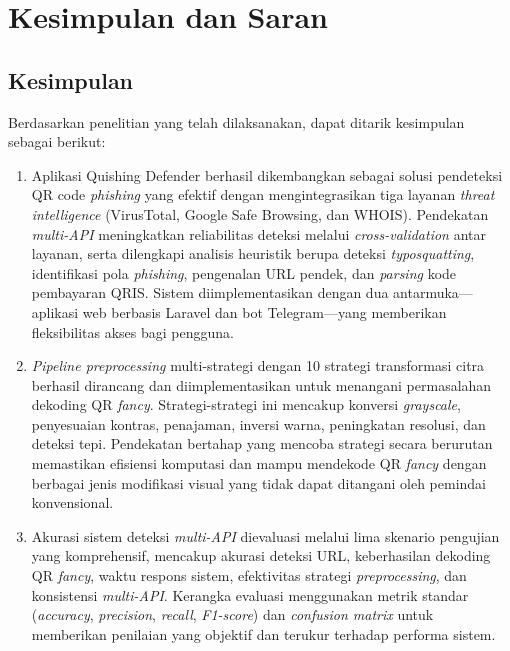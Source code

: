 \documentclass[conference]{IEEEtran}
\begin{document}
\section{Kesimpulan dan Saran}

\subsection{Kesimpulan}

Berdasarkan penelitian yang telah dilaksanakan, dapat ditarik kesimpulan sebagai berikut:

\begin{enumerate}[label=\arabic*)]
    \item Aplikasi Quishing Defender berhasil dikembangkan sebagai solusi pendeteksi QR code \textit{phishing} yang efektif dengan mengintegrasikan tiga layanan \textit{threat intelligence} (VirusTotal, Google Safe Browsing, dan WHOIS). Pendekatan \textit{multi-API} meningkatkan reliabilitas deteksi melalui \textit{cross-validation} antar layanan, serta dilengkapi analisis heuristik berupa deteksi \textit{typosquatting}, identifikasi pola \textit{phishing}, pengenalan URL pendek, dan \textit{parsing} kode pembayaran QRIS. Sistem diimplementasikan dengan dua antarmuka---aplikasi web berbasis Laravel dan bot Telegram---yang memberikan fleksibilitas akses bagi pengguna.
    
    \item \textit{Pipeline preprocessing} multi-strategi dengan 10 strategi transformasi citra berhasil dirancang dan diimplementasikan untuk menangani permasalahan dekoding QR \textit{fancy}. Strategi-strategi ini mencakup konversi \textit{grayscale}, penyesuaian kontras, penajaman, inversi warna, peningkatan resolusi, dan deteksi tepi. Pendekatan bertahap yang mencoba strategi secara berurutan memastikan efisiensi komputasi dan mampu mendekode QR \textit{fancy} dengan berbagai jenis modifikasi visual yang tidak dapat ditangani oleh pemindai konvensional.
    
    \item Akurasi sistem deteksi \textit{multi-API} dievaluasi melalui lima skenario pengujian yang komprehensif, mencakup akurasi deteksi URL, keberhasilan dekoding QR \textit{fancy}, waktu respons sistem, efektivitas strategi \textit{preprocessing}, dan konsistensi \textit{multi-API}. Kerangka evaluasi menggunakan metrik standar (\textit{accuracy}, \textit{precision}, \textit{recall}, \textit{F1-score}) dan \textit{confusion matrix} untuk memberikan penilaian yang objektif dan terukur terhadap performa sistem.
\end{enumerate}
\end{document}
